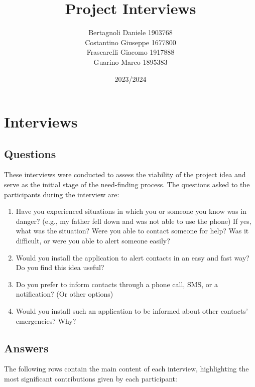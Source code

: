 \documentclass[12pt]{article}
\title{Project Interviews}
\author{Bertagnoli Daniele 1903768 \\ Costantino Giuseppe 1677800 \\ Frascarelli Giacomo 1917888 \\ Guarino Marco 1895383}
\date{2023/2024}
\begin{document}
\maketitle

\tableofcontents
\newpage

\section{Interviews}

\subsection{Questions}
These interviews were conducted to assess the viability of the project idea and serve as the initial stage of the need-finding process. The questions asked to the participants during the interview are:
\begin{enumerate}
    \item Have you experienced situations in which you or someone you know was in danger? (e.g., my father fell down and was not able to use the phone) If yes, what was the situation? Were you able to contact someone for help? Was it difficult, or were you able to alert someone easily?
    \item Would you install the application to alert contacts in an easy and fast way? Do you find this idea useful?
    \item Do you prefer to inform contacts through a phone call, SMS, or a notification? (Or other options)
    \item Would you install such an application to be informed about other contacts' emergencies? Why?
\end{enumerate}

\subsection{Answers}
The following rows contain the main content of each interview, 
highlighting the most significant contributions given by each participant:
\end{document}
